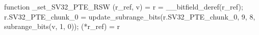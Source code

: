 function _set_SV32_PTE_RSW (r_ref, v) = {
    r = __bitfield_deref(r_ref);
    r.SV32_PTE_chunk_0 = update_subrange_bits(r.SV32_PTE_chunk_0, 9, 8, subrange_bits(v, 1, 0));
    (*r_ref) = r
}
